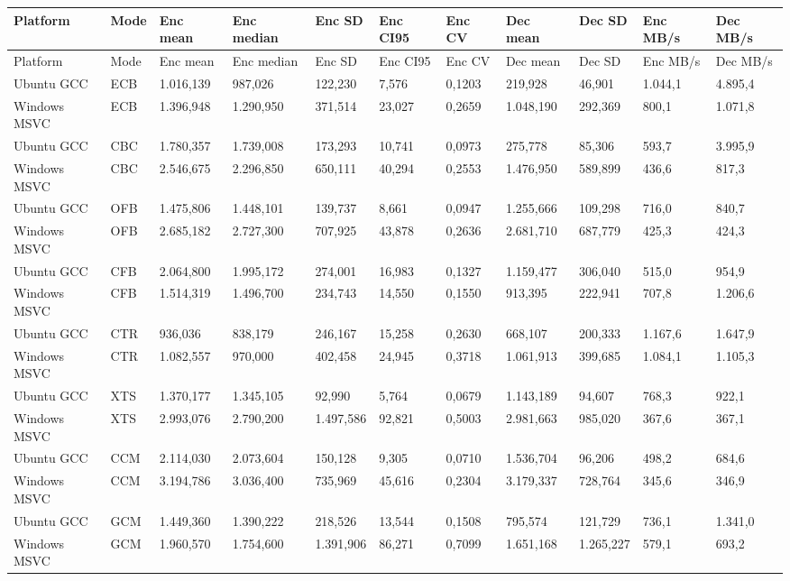 \documentclass[12pt,a4paper,oneside]{report}
\begin{document}
\begin{longtable}{p{}p{}p{}p{}p{}p{}p{}p{}p{}p{}p{}}
\toprule
Platform & Mode & Enc mean & Enc median & Enc SD & Enc CI95 & Enc CV & Dec mean & Dec SD & Enc MB/s & Dec MB/s \\
\midrule
\endfirsthead
\toprule
Platform & Mode & Enc mean & Enc median & Enc SD & Enc CI95 & Enc CV & Dec mean & Dec SD & Enc MB/s & Dec MB/s \\
\midrule
\endhead
Ubuntu GCC & ECB & 1.016,139 & 987,026 & 122,230 & 7,576 & 0,1203 & 219,928 & 46,901 & 1.044,1 & 4.895,4 \\
Windows MSVC & ECB & 1.396,948 & 1.290,950 & 371,514 & 23,027 & 0,2659 & 1.048,190 & 292,369 & 800,1 & 1.071,8 \\
Ubuntu GCC & CBC & 1.780,357 & 1.739,008 & 173,293 & 10,741 & 0,0973 & 275,778 & 85,306 & 593,7 & 3.995,9 \\
Windows MSVC & CBC & 2.546,675 & 2.296,850 & 650,111 & 40,294 & 0,2553 & 1.476,950 & 589,899 & 436,6 & 817,3 \\
Ubuntu GCC & OFB & 1.475,806 & 1.448,101 & 139,737 & 8,661 & 0,0947 & 1.255,666 & 109,298 & 716,0 & 840,7 \\
Windows MSVC & OFB & 2.685,182 & 2.727,300 & 707,925 & 43,878 & 0,2636 & 2.681,710 & 687,779 & 425,3 & 424,3 \\
Ubuntu GCC & CFB & 2.064,800 & 1.995,172 & 274,001 & 16,983 & 0,1327 & 1.159,477 & 306,040 & 515,0 & 954,9 \\
Windows MSVC & CFB & 1.514,319 & 1.496,700 & 234,743 & 14,550 & 0,1550 & 913,395 & 222,941 & 707,8 & 1.206,6 \\
Ubuntu GCC & CTR & 936,036 & 838,179 & 246,167 & 15,258 & 0,2630 & 668,107 & 200,333 & 1.167,6 & 1.647,9 \\
Windows MSVC & CTR & 1.082,557 & 970,000 & 402,458 & 24,945 & 0,3718 & 1.061,913 & 399,685 & 1.084,1 & 1.105,3 \\
Ubuntu GCC & XTS & 1.370,177 & 1.345,105 & 92,990 & 5,764 & 0,0679 & 1.143,189 & 94,607 & 768,3 & 922,1 \\
Windows MSVC & XTS & 2.993,076 & 2.790,200 & 1.497,586 & 92,821 & 0,5003 & 2.981,663 & 985,020 & 367,6 & 367,1 \\
Ubuntu GCC & CCM & 2.114,030 & 2.073,604 & 150,128 & 9,305 & 0,0710 & 1.536,704 & 96,206 & 498,2 & 684,6 \\
Windows MSVC & CCM & 3.194,786 & 3.036,400 & 735,969 & 45,616 & 0,2304 & 3.179,337 & 728,764 & 345,6 & 346,9 \\
Ubuntu GCC & GCM & 1.449,360 & 1.390,222 & 218,526 & 13,544 & 0,1508 & 795,574 & 121,729 & 736,1 & 1.341,0 \\
Windows MSVC & GCM & 1.960,570 & 1.754,600 & 1.391,906 & 86,271 & 0,7099 & 1.651,168 & 1.265,227 & 579,1 & 693,2 \\
\bottomrule
\end{longtable}
\end{document}
